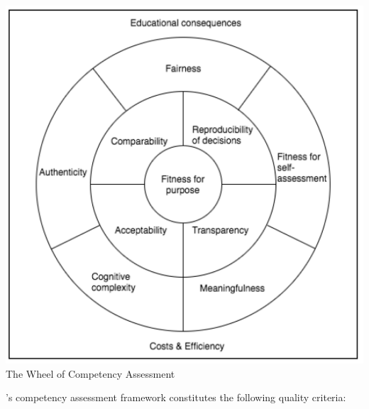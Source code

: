 %

\begin{center}
\includegraphics[scale=0.6]{figures/AdaptedQualityCriteriaCatete.png}\newline
The Wheel of Competency Assessment \cite{baartman2006wheel}\label{fig:AssQualityCriteria}
\end{center}


\citeauthor{baartman2006wheel}'s competency assessment framework constitutes the following quality criteria:

